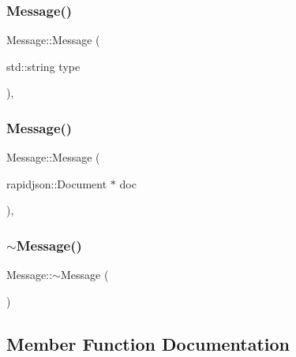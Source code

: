 \subsubsection{\texorpdfstring{Message()}{Message()}\hspace{0.1cm}{\footnotesize\ttfamily [1/2]}}
{\footnotesize\ttfamily Message\+::\+Message (\begin{DoxyParamCaption}\item[{std\+::string}]{type }\end{DoxyParamCaption})\hspace{0.3cm}{\ttfamily [explicit]}, {\ttfamily [protected]}}

\mbox{\label{classMessage_a92ef92d05b8d6ca2647aff6eeb61df70}} 
\subsubsection{\texorpdfstring{Message()}{Message()}\hspace{0.1cm}{\footnotesize\ttfamily [2/2]}}
{\footnotesize\ttfamily Message\+::\+Message (\begin{DoxyParamCaption}\item[{rapidjson\+::\+Document $\ast$}]{doc }\end{DoxyParamCaption})\hspace{0.3cm}{\ttfamily [explicit]}, {\ttfamily [protected]}}

\mbox{\label{classMessage_ad7ecaab66dfea90ed7bf9a3147bcf129}} 
\subsubsection{\texorpdfstring{$\sim$\+Message()}{~Message()}}
{\footnotesize\ttfamily Message\+::$\sim$\+Message (\begin{DoxyParamCaption}{ }\end{DoxyParamCaption})\hspace{0.3cm}{\ttfamily [pure virtual]}}



\subsection{Member Function Documentation}
\mbox{\label{classMessage_aeb65039d076cefaff79b21044a4d8d29}} 

